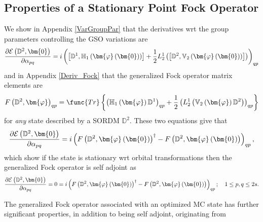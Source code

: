 \documentclass{preprint}
\begin{document}
\subsection{Properties of a Stationary Point Fock Operator\label{Stat_Fock}}

We show in Appendix \ref{VarGroupPar} that the derivatives wrt the group
parameters controlling the GSO variations are
\begin{equation}
\frac{\partial\mathcal{E}\left( \mathbb{D}^{2},\bm{0}\right) }{%
\partial\alpha_{pq}}=i\left( \left[ \mathbb{D}^{1},\mathbb{H}_{1}\left( %
\bm{\varphi}\left( \bm{0}\right) \right) \right] +\frac{1}{2}L_{2}^{1}\left( %
\left[ \mathbb{D}^{2},\mathbb{V}_{2}\left( \bm{\varphi }\left( \bm{0}\right)
\right) \right] \right) \right) _{qp}
\end{equation}
and in Appendix \ref{Deriv_Fock} that the generalized Fock operator matrix
elements are
\begin{equation}
F\left( \mathbb{D}^{2},\bm{\varphi}\right) _{qp}=\func{Tr}\left\{ \left(
\mathbb{H}_{1}\left( \bm{\varphi}\right) \mathbb{D}^{1}\right) _{qp}+\frac{1%
}{2}\left( L_{2}^{1}\left( \mathbb{V}_{2}\left( \bm{\varphi}\right) \mathbb{D%
}^{2}\right) \right) _{qp}\right\}
\end{equation}
for \emph{any} state described by a SORDM $\mathbb{D}^{2}$. These two
equations give that
\begin{equation}
\frac{\partial\mathcal{E}\left( \mathbb{D}^{2},\bm{0}\right) }{%
\partial\alpha_{pq}}=i\left( F\left( \mathbb{D}^{2},\bm{\varphi}\left( \bm{0}%
\right) \right) ^{\dagger}-F\left( \mathbb{D}^{2},\bm{\varphi }\left( \bm{0}%
\right) \right) \right) _{qp},
\end{equation}
which show if the state is stationary wrt orbital transformations then the
generalized Fock operator is self adjoint as
\begin{equation}
\frac{\partial\mathcal{E}\left( \mathbb{D}^{2},\bm{0}\right) }{%
\partial\alpha_{pq}}=0=i\left( F\left( \mathbb{D}^{2},\bm{\varphi }\left( %
\bm{0}\right) \right) ^{\dagger}-F\left( \mathbb{D}^{2},\bm{\varphi}\left( %
\bm{0}\right) \right) \right) _{qp};\quad1\leq p,q\leq2s.
\end{equation}

The generalized Fock operator associated with an optimized MC state has
further significant properties, in addition to being self adjoint,
originating from
\end{document}
